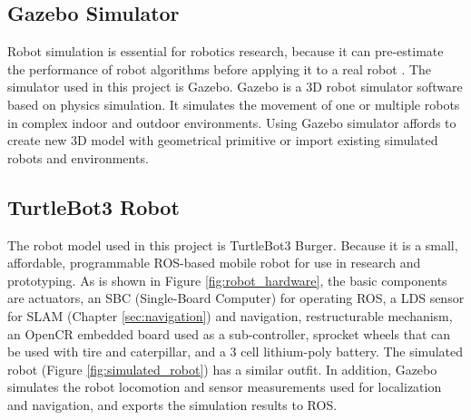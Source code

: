 \subsection{Gazebo Simulator}
Robot simulation is essential for robotics research, because it can pre-estimate the performance of robot algorithms before applying it to a real robot \cite{Afanasyev2015}. 
The simulator used in this project is Gazebo. 
Gazebo\cite{GZ} is a 3D robot simulator software based on physics simulation. It simulates the movement of one or multiple robots in complex indoor and outdoor environments.
Using Gazebo simulator affords to create new 3D model with geometrical primitive or import existing simulated robots and environments. 

\subsection{TurtleBot3 Robot}
The robot model used in this project is TurtleBot3 Burger. Because it is a small, affordable, programmable ROS-based mobile robot for use in research and prototyping. 
As is shown in Figure \ref{fig:robot_hardware}, the basic components are actuators, an SBC (Single-Board Computer) for operating ROS, a LDS sensor for SLAM (Chapter \ref{sec:navigation}) and navigation, restructurable mechanism, an OpenCR embedded board used as a sub-controller, sprocket wheels that can be used with tire and caterpillar, and a 3 cell lithium-poly battery.
The simulated robot (Figure  \ref{fig:simulated_robot}) has a similar outfit. In addition, Gazebo simulates the robot locomotion and sensor measurements used for localization and navigation, and exports the simulation results to ROS.


